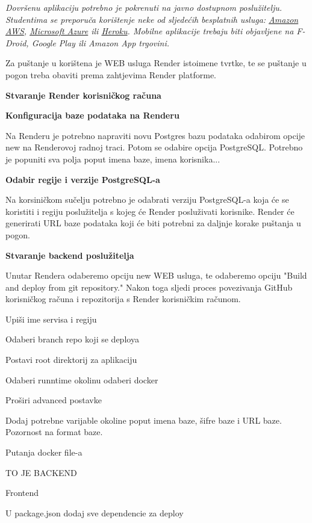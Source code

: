 			
			 \textit{Dovršenu aplikaciju potrebno je pokrenuti na javno dostupnom poslužitelju. Studentima se preporuča korištenje neke od sljedećih besplatnih usluga: \href{https://aws.amazon.com/}{Amazon AWS}, \href{https://azure.microsoft.com/en-us/}{Microsoft Azure} ili \href{https://www.heroku.com/}{Heroku}. Mobilne aplikacije trebaju biti objavljene na F-Droid, Google Play ili Amazon App trgovini.}
			 
			Za puštanje u korištena je WEB usluga Render istoimene tvrtke, te se puštanje u pogon treba obaviti prema zahtjevima Render platforme. 
			 	
			 \textbf{Stvaranje Render korisničkog računa}
			 	
			 \textbf{Konfiguracija baze podataka na Renderu}
			 
			 Na Renderu je potrebno napraviti novu Postgres bazu podataka odabirom opcije new na Renderovoj radnoj traci. Potom se odabire opcija PostgreSQL. Potrebno je popuniti sva polja poput imena baze, imena korisnika...
			 
			 \textbf{Odabir regije i verzije PostgreSQL-a}
			 
			 Na korsiničkom sučelju potrebno je odabrati verziju PostgreSQL-a koja će se koristiti i regiju poslužitelja s kojeg će Render posluživati korisnike. Render će generirati URL baze podataka koji će biti potrebni za daljnje korake puštanja u pogon.
			 
			 \textbf{Stvaranje backend poslužitelja}
			 
			 Unutar Rendera odaberemo opciju new WEB usluga, te odaberemo opciju "Build and deploy from git repository." Nakon toga sljedi proces povezivanja GitHub korisničkog računa i repozitorija s Render korisničkim računom.
			 
			 Upiši ime servisa i regiju
			 
			 Odaberi branch repo koji se deploya
			 
			 Postavi root direktorij za aplikaciju
			 
			 Odaberi runntime okolinu odaberi docker 
			 
			 Proširi advanced postavke 
			 
			 Dodaj potrebne varijable okoline poput imena baze, šifre baze i URL baze. Pozornost na format baze.
			 
			 Putanja docker file-a
			 
			 TO JE BACKEND
			 
			 Frontend 
			 
			 U package.json dodaj sve dependencie za deploy
			 
